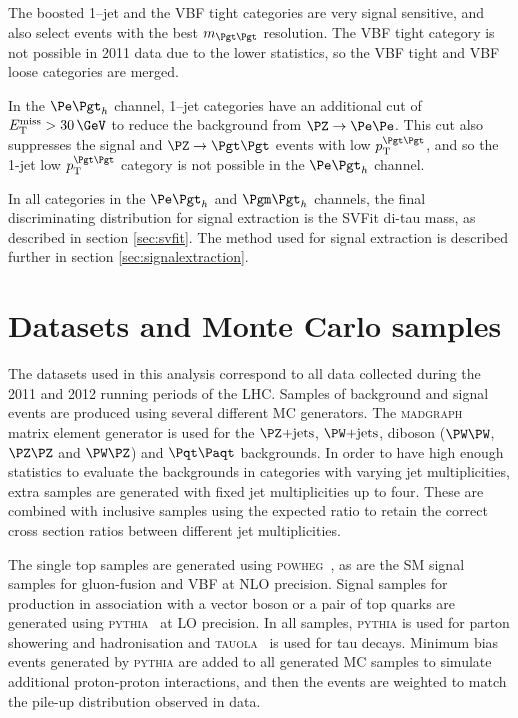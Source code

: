 The boosted 1--jet and the VBF tight categories are very 
signal sensitive, and also select events with the best $m_{\Pgt\Pgt}$ resolution.
The VBF tight category is not possible in 2011 data due to the lower statistics,
so the VBF tight and VBF loose categories are merged. 

In the $\etau$ channel, 1--jet categories have an additional cut of $\MET >
30\,\GeV$ to reduce the background from $\PZ\to\Pe\Pe$. This cut also suppresses the
signal and $\ZToTauTau$ events with low $\pt^{\Pgt\Pgt}$, and so the 1-jet low
$\pt^{\Pgt\Pgt}$ category is not possible in the $\etau$ channel. 

In all categories in the $\etau$ and $\mutau$ channels, the final discriminating
distribution for signal extraction is the SVFit di-tau mass, as described in
section \ref{sec:svfit}. The method used for signal extraction is described
further in section \ref{sec:signalextraction}.

\section{Datasets and Monte Carlo samples}
\label{sec:dataandMC}

The datasets used in this analysis correspond to all data collected during the 2011 and
2012 running periods of the LHC. Samples of background and signal events are produced using several different
\ac{MC} generators. The \textsc{madgraph}~\cite{Alwall:2011uj} matrix element
generator is used for the $\ZJets$, $\WJets$, diboson ($\PW\PW$, $\PZ\PZ$ and
$\PW\PZ$) and $\ttbar$ backgrounds. 
In order to have high enough statistics to evaluate the
backgrounds in categories with varying jet multiplicities, extra samples are
generated with fixed jet multiplicities up to four. These are combined with
inclusive samples using the expected ratio to retain the correct cross section
ratios between different jet multiplicities. 

The single top samples are generated using
\textsc{powheg}~\cite{Frixione:2007vw,Alioli:2010xd,Alioli:2010xa}, as are the
\ac{SM} signal samples for gluon-fusion and \ac{VBF} at \ac{NLO} precision. Signal
samples for production in association with a vector boson or a pair of top
quarks are generated using
\textsc{pythia}~\cite{Sjostrand:2006za} at \ac{LO} precision. In all
samples, \textsc{pythia} is used for parton showering and hadronisation and
\textsc{tauola}~\cite{TAUOLA} is used for tau decays. Minimum bias events
generated by \textsc{pythia} are added to all generated \ac{MC} samples
to simulate additional proton-proton interactions, and then the events are
weighted to match the pile-up distribution observed in data. 

